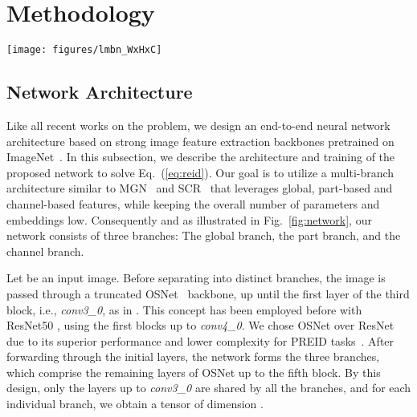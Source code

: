 \documentclass{article}
\newcommand{\figcaption}[2]{
\caption{\textbf{#1} #2}
}
\begin{document}
\section{Methodology}
\label{sec:metho}
\begin{figure*}
    \centering
    \texttt{[image: figures/lmbn\_WxHxC]}
    \figcaption{Structure of our network.}{After forwarding images through the first three blocks of an OSNet backbone, our network continues in three distinct branches to learn global, channel-based and part-based features. All volumes are forwarded to BNNeck layers to produce final embeddings suited for different loss functions.}
    \label{fig:network}
\end{figure*}

\subsection{Network Architecture}
Like all recent works on the problem, we design an end-to-end neural network architecture based on strong image feature extraction backbones pretrained on ImageNet~\cite{krizhevsky2012imagenet}. In this subsection, we describe the architecture and training of the proposed network to solve Eq.~(\ref{eq:reid}). Our goal is to utilize a multi-branch architecture similar to MGN~\cite{wang2018learning} and SCR~\cite{chen2020learning} that leverages global, part-based and channel-based features, while keeping the overall number of parameters and embeddings low. Consequently and as illustrated in Fig.~\ref{fig:network}, our network consists of three branches: The global branch, the part branch, and the channel branch.

Let  be an input image. Before separating into distinct branches, the image  is passed through a truncated OSNet~\cite{zhou2019omni} backbone, up until the first layer of the third block, i.e., \emph{conv3\_0}, as in \cite{xie2020learning}. This concept has been employed before with ResNet50 \cite{wang2018learning, chen2020learning}, using the first blocks up to \emph{conv4\_0}. We chose OSNet over ResNet due to its superior performance and lower complexity for \ac{PREID} tasks~\cite{zhou2019omni,xie2020learning}. After forwarding  through the initial layers, the network forms the three branches, which comprise the remaining layers of OSNet up to the fifth block. By this design, only the layers up to \emph{conv3\_0} are shared by all the branches, and for each individual branch, we obtain a tensor of dimension .
\end{document}

